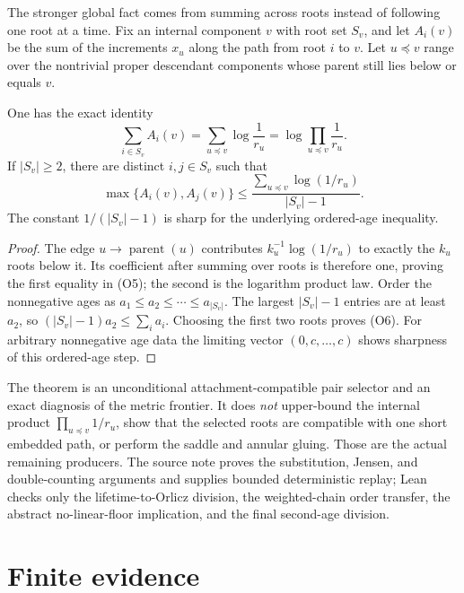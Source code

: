 The stronger global fact comes from summing across roots instead of following
one root at a time.  Fix an internal component $v$ with root set $S_v$, and
let $A_i(v)$ be the sum of the increments $x_u$ along the path from root $i$
to $v$.  Let $u\preceq v$ range over the nontrivial proper descendant
components whose parent still lies below or equals $v$.

\begin{theorem}
\label{res:orlicz-selector}
One has the exact identity
\[
 \sum_{i\in S_v}A_i(v)
 =\sum_{u\preceq v}\log\frac1{r_u}
 =\log\prod_{u\preceq v}\frac1{r_u}.                  \tag{O5}
\]
If $|S_v|\ge2$, there are distinct $i,j\in S_v$ such that
\[
 \max\{A_i(v),A_j(v)\}
 \le
 \frac{\sum_{u\preceq v}\log(1/r_u)}{|S_v|-1}.       \tag{O6}
\]
The constant $1/(|S_v|-1)$ is sharp for the underlying ordered-age
inequality.
\end{theorem}

\begin{proof}
The edge $u\to\operatorname{parent}(u)$ contributes
$k_u^{-1}\log(1/r_u)$ to exactly the $k_u$ roots below it.  Its coefficient
after summing over roots is therefore one, proving the first equality in
(O5); the second is the logarithm product law.  Order the nonnegative ages as
$a_1\le a_2\le\cdots\le a_{|S_v|}$.  The largest $|S_v|-1$ entries are at
least $a_2$, so
$(|S_v|-1)a_2\le\sum_i a_i$.  Choosing the first two roots proves (O6).
For arbitrary nonnegative age data the limiting vector $(0,c,\ldots,c)$
shows sharpness of this ordered-age step.
\end{proof}

The theorem is an unconditional attachment-compatible pair selector and an
exact diagnosis of the metric frontier.  It does \emph{not} upper-bound the
internal product $\prod_{u\preceq v}1/r_u$, show that the selected roots are
compatible with one short embedded path, or perform the saddle and annular
gluing.  Those are the actual remaining producers.  The source note proves
the substitution, Jensen, and double-counting arguments and supplies bounded
deterministic replay; Lean checks only the lifetime-to-Orlicz division, the
weighted-chain order transfer, the abstract no-linear-floor implication, and
the final second-age division.



\section{Finite evidence}\label{sec:finite}

